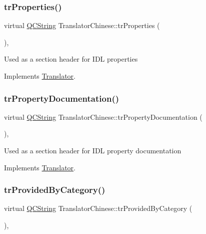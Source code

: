 \subsubsection{\texorpdfstring{trProperties()}{trProperties()}}
{\footnotesize\ttfamily virtual \mbox{\hyperlink{class_q_c_string}{Q\+C\+String}} Translator\+Chinese\+::tr\+Properties (\begin{DoxyParamCaption}{ }\end{DoxyParamCaption})\hspace{0.3cm}{\ttfamily [inline]}, {\ttfamily [virtual]}}

Used as a section header for I\+DL properties 

Implements \mbox{\hyperlink{class_translator}{Translator}}.

\mbox{\label{class_translator_chinese_a7edd5b1aba83e5e8897830468b6d805c}} 
\subsubsection{\texorpdfstring{trPropertyDocumentation()}{trPropertyDocumentation()}}
{\footnotesize\ttfamily virtual \mbox{\hyperlink{class_q_c_string}{Q\+C\+String}} Translator\+Chinese\+::tr\+Property\+Documentation (\begin{DoxyParamCaption}{ }\end{DoxyParamCaption})\hspace{0.3cm}{\ttfamily [inline]}, {\ttfamily [virtual]}}

Used as a section header for I\+DL property documentation 

Implements \mbox{\hyperlink{class_translator}{Translator}}.

\mbox{\label{class_translator_chinese_ad1e9618be697dab51459a24003fcdfe1}} 
\subsubsection{\texorpdfstring{trProvidedByCategory()}{trProvidedByCategory()}}
{\footnotesize\ttfamily virtual \mbox{\hyperlink{class_q_c_string}{Q\+C\+String}} Translator\+Chinese\+::tr\+Provided\+By\+Category (\begin{DoxyParamCaption}{ }\end{DoxyParamCaption})\hspace{0.3cm}{\ttfamily [inline]}, {\ttfamily [virtual]}}

